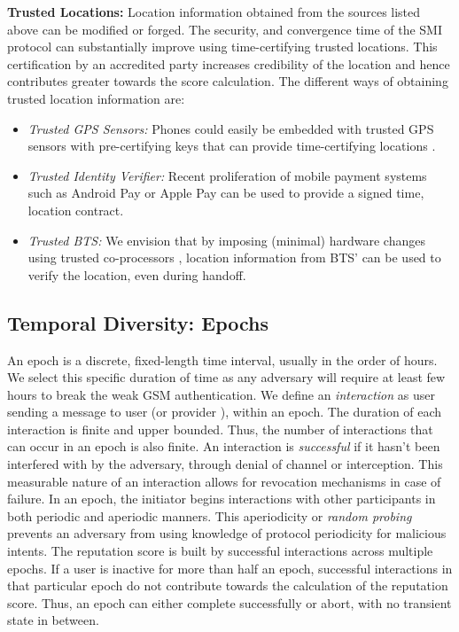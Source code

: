 \documentclass[letterpaper,twocolumn]{sig-alternate}
\begin{document}
\textbf{Trusted Locations:} Location information obtained from the sources listed above can be modified or forged. The security, and convergence time of the SMI protocol can substantially improve using time-certifying trusted locations. This certification by an accredited party increases credibility of the location and hence contributes greater towards the score calculation. The different ways of obtaining trusted location information are:
\vspace{-2mm}
\begin{itemize}
\itemsep-0.23em 
\item {\em Trusted GPS Sensors:} Phones could easily be embedded with trusted GPS sensors with pre-certifying keys that can provide time-certifying locations \cite{saroiu2010sensor}.

\item {\em Trusted Identity Verifier:} Recent proliferation of mobile payment systems such as Android Pay or Apple Pay can be used to provide a signed time, location contract. 

\item {\em Trusted BTS:} We envision that by imposing (minimal) hardware changes using trusted co-processors \cite{yee1995secure}, location information from BTS' can be used to verify the location, even during handoff.
\end{itemize}
\vspace{-2mm}

\subsection{Temporal Diversity: Epochs}
\label{time}

An epoch is a discrete, fixed-length time interval, usually in the order of hours. We select this specific duration of time as any adversary will require at least few hours to break the weak GSM authentication. We define an \textit{interaction} as user  sending a message to user  (or provider ), within an epoch. The duration of each interaction is finite and upper bounded. Thus, the number of interactions that can occur in an epoch is also finite. An interaction is \textit{successful} if it hasn't been interfered with by the adversary, through denial of channel or interception. This measurable nature of an interaction allows for revocation mechanisms in case of failure. In an epoch, the initiator begins interactions with other participants in both periodic and aperiodic manners. This aperiodicity or \textit{random probing} prevents an adversary from using knowledge of protocol periodicity for malicious intents. The reputation score is built by successful interactions across multiple epochs. If a user is inactive for more than half an epoch, successful interactions in that particular epoch do not contribute towards the calculation of the reputation score. Thus, an epoch can either complete successfully or abort, with no transient state in between.
\end{document}
